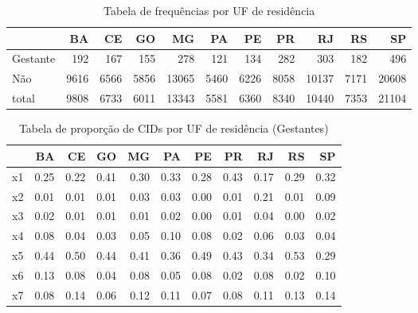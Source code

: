 \documentclass[
]{article}
\begin{document}
\begin{table}

\caption{\label{tab:unnamed-chunk-11}Tabela de frequências por UF de residência}
\centering
\begin{tabular}[t]{l|r|r|r|r|r|r|r|r|r|r}
\hline
  & BA & CE & GO & MG & PA & PE & PR & RJ & RS & SP\\
\hline
Gestante & 192 & 167 & 155 & 278 & 121 & 134 & 282 & 303 & 182 & 496\\
\hline
Não & 9616 & 6566 & 5856 & 13065 & 5460 & 6226 & 8058 & 10137 & 7171 & 20608\\
\hline
total & 9808 & 6733 & 6011 & 13343 & 5581 & 6360 & 8340 & 10440 & 7353 & 21104\\
\hline
\end{tabular}
\end{table}

\begin{table}

\caption{\label{tab:unnamed-chunk-11}Tabela de proporção de CIDs por UF de residência (Gestantes)}
\centering
\begin{tabular}[t]{l|r|r|r|r|r|r|r|r|r|r}
\hline
  & BA & CE & GO & MG & PA & PE & PR & RJ & RS & SP\\
\hline
x1 & 0.25 & 0.22 & 0.41 & 0.30 & 0.33 & 0.28 & 0.43 & 0.17 & 0.29 & 0.32\\
\hline
x2 & 0.01 & 0.01 & 0.01 & 0.03 & 0.03 & 0.00 & 0.01 & 0.21 & 0.01 & 0.09\\
\hline
x3 & 0.02 & 0.01 & 0.01 & 0.01 & 0.02 & 0.00 & 0.01 & 0.04 & 0.00 & 0.02\\
\hline
x4 & 0.08 & 0.04 & 0.03 & 0.05 & 0.10 & 0.08 & 0.02 & 0.06 & 0.03 & 0.04\\
\hline
x5 & 0.44 & 0.50 & 0.44 & 0.41 & 0.36 & 0.49 & 0.43 & 0.34 & 0.53 & 0.29\\
\hline
x6 & 0.13 & 0.08 & 0.04 & 0.08 & 0.05 & 0.08 & 0.02 & 0.08 & 0.02 & 0.10\\
\hline
x7 & 0.08 & 0.14 & 0.06 & 0.12 & 0.11 & 0.07 & 0.08 & 0.11 & 0.13 & 0.14\\
\hline
\end{tabular}
\end{table}
\end{document}
